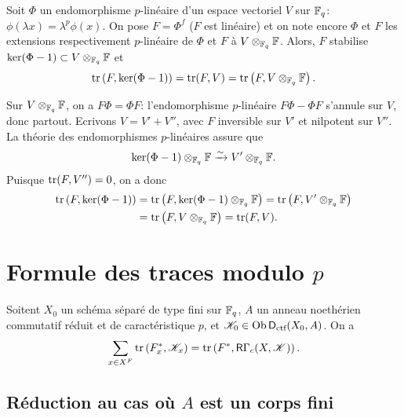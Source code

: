 \begin{lemma_}\label{III:3-8}
Soit $\Phi$ un endomorphisme $p$-lin\'eaire d'un espace vectoriel $V$ sur 
$\mathbb{F}_q$: $\phi(\lambda x) = \lambda^p\phi(x)$. On pose $F=\Phi^f$ ($F$ est 
lin\'eaire) et on note encore $\Phi$ et $F$ les extensions respectivement 
$p$-lin\'eaire de $\Phi$ et $F$ \`a $V\otimes_{\mathbb{F}_q}\mathbb{F}$. Alors, $F$ stabilise 
$\ker(\Phi-1)\subset V\otimes_{\mathbb{F}_q}\mathbb{F}$ et 
\[
  \operatorname{tr}\left(F,\ker(\Phi-1)\right) = \operatorname{tr}(F,V) = \operatorname{tr}\left(F,V\otimes_{\mathbb{F}_q}\mathbb{F}\right) \text{.}
\]
\end{lemma_}

Sur $V\otimes_{\mathbb{F}_q}\mathbb{F}$, on a $F\Phi = \Phi F$: l'endomorphisme $p$-lin\'eaire 
$F\Phi-\Phi F$ s'annule sur $V$, donc partout. Ecrivons $V=V'+V''$, avec $F$ 
inversible sur $V'$ et nilpotent sur $V''$. La th\'eorie des endomorphismes 
$p$-lin\'eaires assure que 
\[
  \ker(\Phi-1)\otimes_{\mathbb{F}_q}\mathbb{F} \xrightarrow\sim V'\otimes_{\mathbb{F}_q}\mathbb{F} \text{.}
\]
Puisque $\operatorname{tr}(F,V'') = 0$, on a donc 
\begin{align*}
  \operatorname{tr}\left(F,\ker(\Phi-1)\right) 
    &= \operatorname{tr}\left(F,\ker(\Phi-1)\otimes_{\mathbb{F}_q}\mathbb{F}\right) = \operatorname{tr}\left(F,V'\otimes_{\mathbb{F}_q}\mathbb{F}\right) \\
    &= \operatorname{tr}\left(F,V\otimes_{\mathbb{F}_q}\mathbb{F}\right) = \operatorname{tr}(F,V) \text{.}
\end{align*}










\section{Formule des traces modulo $p$}\label{III:4}





\begin{theorem_}\label{III:4-1}
Soitent $X_0$ un sch\'ema s\'epar\'e de type fini sur $\mathbb{F}_q$, $A$ un anneau 
noeth\'erien commutatif r\'eduit et de caract\'eristique $p$, et 
$\mathscr{K}_0\in\operatorname{Ob}\mathsf{D}_\textnormal{ctf}(X_0,A)$. On a 
\begin{equation}\label{III:eq:4-1-1}
  \sum_{x\in X^F} \operatorname{tr}\left(F_x^*,\mathscr{K}_x\right) = \operatorname{tr}\left(F^*,\mathsf{R}\Gamma_c(X,\mathscr{K})\right) \text{.}
\end{equation}
\end{theorem_}





\subsection{R\'eduction au cas o\`u $A$ est un corps fini}\label{III:4-2}

